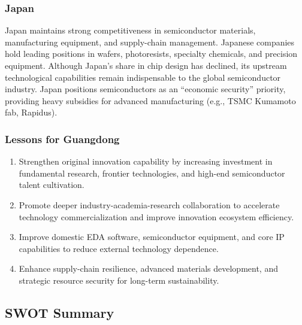 \documentclass[12pt,a4paper]{article}
\begin{document}
\subsubsection{Japan}

Japan maintains strong competitiveness in semiconductor materials,
manufacturing equipment, and supply-chain management. Japanese companies
hold leading positions in wafers, photoresists, specialty chemicals, and
precision equipment. Although Japan's share in chip design has declined,
its upstream technological capabilities remain indispensable to the
global semiconductor industry. Japan positions semiconductors as an
``economic security'' priority, providing heavy subsidies for advanced
manufacturing (e.g., TSMC Kumamoto fab, Rapidus).

\subsubsection{Lessons for Guangdong}

\begin{enumerate}[label=(\arabic*)]
    \item Strengthen original innovation capability by increasing
          investment in fundamental research, frontier technologies,
          and high-end semiconductor talent cultivation.
    \item Promote deeper industry-academia-research collaboration to
          accelerate technology commercialization and improve innovation
          ecosystem efficiency.
    \item Improve domestic EDA software, semiconductor equipment, and
          core IP capabilities to reduce external technology dependence.
    \item Enhance supply-chain resilience, advanced materials development,
          and strategic resource security for long-term sustainability.
\end{enumerate}

\subsection{SWOT Summary}
\label{sec:swot}
\end{document}
